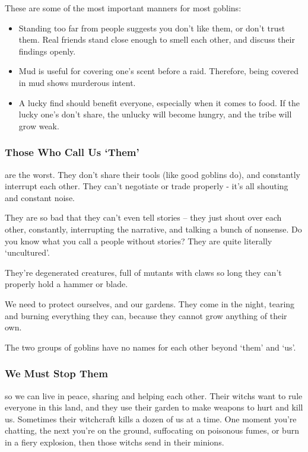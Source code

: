 \begin{multicols}{2}
These are some of the most important manners for most goblins:

\begin{itemize}
  \item
  Standing too far from people suggests you don't like them, or don't trust them.
  Real friends stand close enough to smell each other, and discuss their findings openly.
  \item
  Mud is useful for covering one's scent before a raid.
  Therefore, being covered in mud shows murderous intent.
  \item
  A lucky find should benefit everyone, especially when it comes to food.
  If the lucky one's don't share, the unlucky will become hungry, and the tribe will grow weak.
\end{itemize}

\subsubsection{Those Who Call Us `Them'}
\begin{exampletext}
are the worst.
They don't share their tools (like good goblins do), and constantly interrupt each other.
They can't negotiate or trade properly - it's all shouting and constant noise.

They are so bad that they can't even tell stories -- they just shout over each other, constantly, interrupting the narrative, and talking a bunch of nonsense.
Do you know what you call a people without stories?
They are quite literally `uncultured'.

They're degenerated creatures, full of mutants with claws so long they can't properly hold a hammer or blade.

We need to protect ourselves, and our gardens.
They come in the night, tearing and burning everything they can, because they cannot grow anything of their own.

\end{exampletext}

The two groups of goblins have no names for each other beyond `them' and `us'.

\subsubsection{We Must Stop Them}
\begin{exampletext}
so we can live in peace, sharing and helping each other.
Their \glspl{witch} want to rule everyone in this land, and they use their garden to make weapons to hurt and kill us.
Sometimes their \gls{witchcraft} kills a dozen of us at a time.
One moment you're chatting, the next you're on the ground, suffocating on poisonous fumes, or burn in a fiery explosion, then those \glspl{witch} send in their minions.


\end{exampletext}
\end{multicols}
